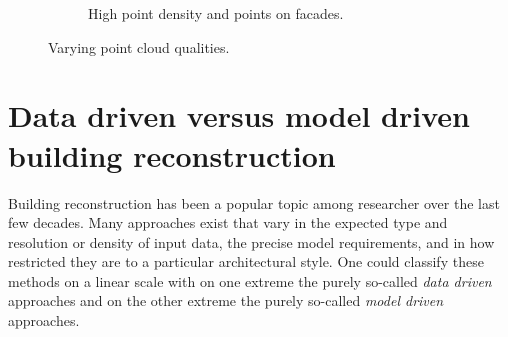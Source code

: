 \begin{description}
\begin{figure}
\begin{subfigure}[b]{0.45\linewidth}
			\caption{High point density and points on facades.}%
			\label{fig:pc-quality:high}
		\end{subfigure}
		\caption{Varying point cloud qualities.}%
		\label{fig:pc-quality}
	\end{figure}
	
\end{description}

%
\section{Data driven versus model driven building reconstruction}
Building reconstruction has been a popular topic among researcher over the last few decades. 
Many approaches exist that vary in the expected type and resolution or density of input data, the precise model requirements, and in how restricted they are to a particular architectural style.
One could classify these methods on a linear scale with on one extreme the purely so-called \emph{data  driven} approaches and on the other extreme the purely so-called \emph{model driven} approaches.
